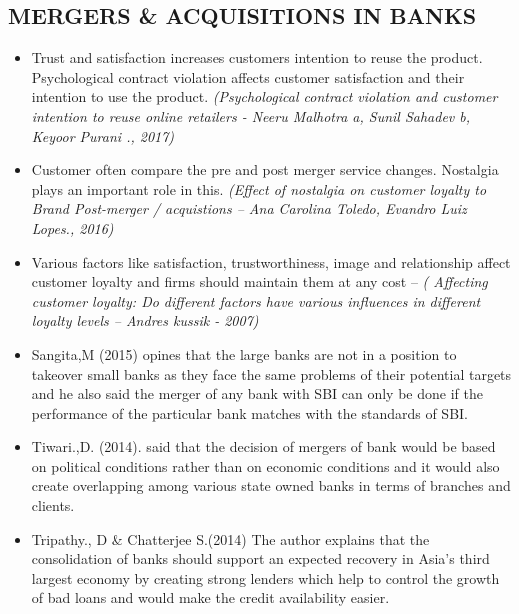 \documentclass[a4paper, 12pt]{extarticle}
\begin{document}
{\subsection{MERGERS \& ACQUISITIONS IN BANKS}
\begin{itemize}
\item Trust and satisfaction increases customers intention to reuse the product. Psychological contract violation affects customer satisfaction and their intention to use the product. \emph{(Psychological contract violation and customer intention to reuse online retailers - Neeru Malhotra a, Sunil Sahadev b, Keyoor Purani ., 2017)}
\item Customer often compare the pre and post merger service changes. Nostalgia plays an important role in this. \emph{(Effect of nostalgia on customer loyalty to Brand Post-merger / acquistions – Ana Carolina Toledo, Evandro Luiz Lopes., 2016)}
\item Various factors like satisfaction, trustworthiness, image and relationship affect customer loyalty and firms should maintain them at any cost – \emph{( Affecting customer loyalty: Do different factors have various influences in different loyalty levels – Andres kussik  - 2007)}
\item Sangita,M (2015) opines that the large banks are not in a position to takeover small banks as they face the same problems of their potential targets and he also said the merger of any bank with SBI can only be done if the performance of the particular bank matches with the standards of SBI. 
\item Tiwari.,D. (2014). said that the decision of mergers of bank would be based on political conditions rather than on economic conditions and it would also create overlapping among various state owned banks in terms of branches and clients.
\item Tripathy., D \& Chatterjee S.(2014) The author explains that the consolidation of banks should support an expected recovery in Asia's third largest economy by creating strong lenders which help to control the growth of bad loans and would make the credit availability easier. 
\end{itemize}
}
\end{document}

